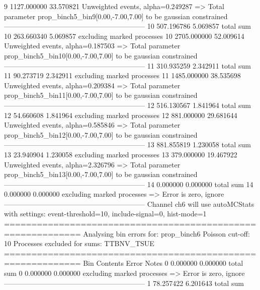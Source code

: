 9          1127.000000     33.570821       Unweighted events, alpha=0.249287
  => Total parameter prop_binch5_bin9[0.00,-7.00,7.00] to be gaussian constrained
------------------------------------------------------------
10         507.196786      5.069857        total sum                     
10         263.660340      5.069857        excluding marked processes    
10         2705.000000     52.009614       Unweighted events, alpha=0.187503
  => Total parameter prop_binch5_bin10[0.00,-7.00,7.00] to be gaussian constrained
------------------------------------------------------------
11         310.935259      2.342911        total sum                     
11         90.273719       2.342911        excluding marked processes    
11         1485.000000     38.535698       Unweighted events, alpha=0.209384
  => Total parameter prop_binch5_bin11[0.00,-7.00,7.00] to be gaussian constrained
------------------------------------------------------------
12         516.130567      1.841964        total sum                     
12         54.660608       1.841964        excluding marked processes    
12         881.000000      29.681644       Unweighted events, alpha=0.585846
  => Total parameter prop_binch5_bin12[0.00,-7.00,7.00] to be gaussian constrained
------------------------------------------------------------
13         881.855819      1.230058        total sum                     
13         23.940904       1.230058        excluding marked processes    
13         379.000000      19.467922       Unweighted events, alpha=2.326796
  => Total parameter prop_binch5_bin13[0.00,-7.00,7.00] to be gaussian constrained
------------------------------------------------------------
14         0.000000        0.000000        total sum                     
14         0.000000        0.000000        excluding marked processes    
  => Error is zero, ignore      
------------------------------------------------------------
Channel ch6 will use autoMCStats with settings: event-threshold=10, include-signal=0, hist-mode=1
============================================================
Analysing bin errors for: prop_binch6
Poisson cut-off: 10
Processes excluded for sums: TTBNV_TSUE
============================================================
Bin        Contents        Error           Notes                         
0          0.000000        0.000000        total sum                     
0          0.000000        0.000000        excluding marked processes    
  => Error is zero, ignore      
------------------------------------------------------------
1          78.257422       6.201643        total sum                     
